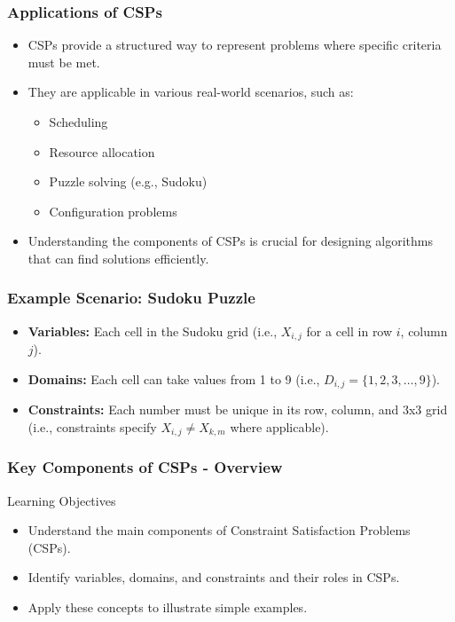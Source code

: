 \documentclass[aspectratio=169]{beamer}
\begin{document}
\begin{frame}[fragile]
    \frametitle{Applications of CSPs}
    \begin{itemize}
        \item CSPs provide a structured way to represent problems where specific criteria must be met.
        \item They are applicable in various real-world scenarios, such as:
        \begin{itemize}
            \item Scheduling
            \item Resource allocation
            \item Puzzle solving (e.g., Sudoku)
            \item Configuration problems
        \end{itemize}
        \item Understanding the components of CSPs is crucial for designing algorithms that can find solutions efficiently.
    \end{itemize}
\end{frame}

\begin{frame}[fragile]
    \frametitle{Example Scenario: Sudoku Puzzle}
    \begin{itemize}
        \item \textbf{Variables:} Each cell in the Sudoku grid (i.e., \(X_{i,j}\) for a cell in row \(i\), column \(j\)).
        \item \textbf{Domains:} Each cell can take values from 1 to 9 (i.e., \(D_{i,j} = \{1, 2, 3, \dots, 9\}\)).
        \item \textbf{Constraints:} Each number must be unique in its row, column, and 3x3 grid (i.e., constraints specify \(X_{i,j} \neq X_{k,m}\) where applicable).
    \end{itemize}
\end{frame}

\begin{frame}[fragile]
  \frametitle{Key Components of CSPs - Overview}
  \begin{block}{Learning Objectives}
    \begin{itemize}
      \item Understand the main components of Constraint Satisfaction Problems (CSPs).
      \item Identify variables, domains, and constraints and their roles in CSPs.
      \item Apply these concepts to illustrate simple examples.
    \end{itemize}
  \end{block}
\end{frame}
\end{document}
